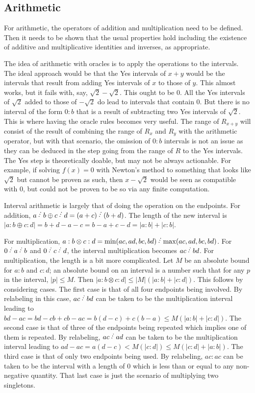 \documentclass[12pt]{article}
\begin{document}
\subsection{Arithmetic}

For arithmetic, the operators of addition and multiplication need to be defined. Then it needs to be shown that the usual properties hold including the existence of additive and multiplicative identities and inverses, as appropriate. 

The idea of arithmetic with oracles is to apply the operations to the intervals. The ideal approach would be that the Yes intervals of $x+y$ would be the intervals that result from adding Yes intervals of $x$ to those of $y$. This almost works, but it fails with, say, $\sqrt{2} - \sqrt{2}$. This ought to be 0. All the Yes intervals of $\sqrt{2}$ added to those of $-\sqrt{2}$ do lead to intervals that contain 0. But there is no interval of the form $0:b$ that is a result of subtracting two Yes intervals of $\sqrt{2}$. This is where having the oracle rules becomes very useful. The range of $R_{x+y}$ will consist of the result of combining the range of $R_x$ and $R_y$ with the arithmetic operator, but with that scenario, the omission of $0:b$ intervals is not an issue as they can be deduced in the step going from the range of $R$ to the Yes intervals. The Yes step is theoretically doable, but may not be always actionable. For example, if solving $f(x)=0$ with Newton's method to something that looks like $\sqrt{2}$ but cannot be proven as such, then $x - \sqrt{2}$ would be seen as compatible with 0, but could not be proven to be so via any finite computation. 

Interval arithmetic is largely that of doing the operation on the endpoints. For addition, $a \lte b \oplus c \lte d = (a+c) \lte (b+d)$. The length of the new interval is $|a:b \oplus c:d| = b+d - a- c = b-a+ c-d = |a:b|+|c:b|$. 

For multiplication, $a:b \otimes c:d = \min(ac, ad, bc, bd)\lte \max(ac, ad, bc, bd)$. For $0 \lte a \lte b$ and $0 \lte c \lte d$, the interval multiplication becomes $ac \lte bd$. For multiplication, the length is a bit more complicated. Let $M$ be an absolute bound for $a:b$ and $c:d$; an absolute bound on an interval is a number such that for any $p$ in the interval, $|p| \leq M$. Then $|a:b \otimes c:d| \leq |M|(|a:b| + |c:d|)$. This follows by considering cases. The first case is that of all four endpoints being involved. By relabeling in this case,  $ac \lte bd$ can be taken to be the multiplication interval leading to $bd - ac = bd - cb + cb - ac = b(d-c) + c (b-a) \leq M (|a:b| + |c:d|)$. The second case is that of three of the endpoints being repeated which implies one of them is repeated. By relabeling, $ac \lte ad$ can be taken to be the multiplication interval leading to $ad - ac= a(d-c) < M (|c:d|) \leq M (|c:d| + |a:b|)$. The third case is that of only two endpoints being used. By relabeling, $ac:ac$ can be taken to be the interval with a length of 0 which is less than or equal to any non-negative quantity.  That last case is just the scenario of multiplying two singletons. 
\end{document}
